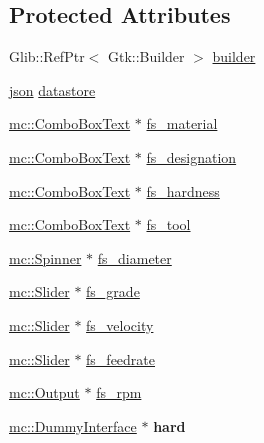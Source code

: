\subsection*{Protected Attributes}
\begin{DoxyCompactItemize}
\item 
Glib\+::\+Ref\+Ptr$<$ Gtk\+::\+Builder $>$ \hyperlink{classmcalc_1_1Application_ae877f6c9210ec88c743a54f750a54892}{builder}
\item 
\hyperlink{application_8hpp_ab701e3ac61a85b337ec5c1abaad6742d}{json} \hyperlink{classmcalc_1_1Application_a2fa9d06d424a8def5ea70fa07e844b9c}{datastore}
\item 
\hyperlink{classmc_1_1ComboBoxText}{mc\+::\+Combo\+Box\+Text} $\ast$ \hyperlink{classmcalc_1_1Application_a8c78f8ea0615db28858001aa5ed6b7b6}{fs\+\_\+material}
\item 
\hyperlink{classmc_1_1ComboBoxText}{mc\+::\+Combo\+Box\+Text} $\ast$ \hyperlink{classmcalc_1_1Application_a5dd81c68d005acedeb18336bfe87cdcb}{fs\+\_\+designation}
\item 
\hyperlink{classmc_1_1ComboBoxText}{mc\+::\+Combo\+Box\+Text} $\ast$ \hyperlink{classmcalc_1_1Application_acf53945a5bd5386c2d492e225878c45c}{fs\+\_\+hardness}
\item 
\hyperlink{classmc_1_1ComboBoxText}{mc\+::\+Combo\+Box\+Text} $\ast$ \hyperlink{classmcalc_1_1Application_a9775057e24515e6e3cf8c1c9a3144512}{fs\+\_\+tool}
\item 
\hyperlink{classmc_1_1Spinner}{mc\+::\+Spinner} $\ast$ \hyperlink{classmcalc_1_1Application_aa5fa7c6a44d89abb85a6947767261698}{fs\+\_\+diameter}
\item 
\hyperlink{classmc_1_1Slider}{mc\+::\+Slider} $\ast$ \hyperlink{classmcalc_1_1Application_aa92847f0410356a5515c461b269a840d}{fs\+\_\+grade}
\item 
\hyperlink{classmc_1_1Slider}{mc\+::\+Slider} $\ast$ \hyperlink{classmcalc_1_1Application_a6d4441380476fcbdafe23b28da5f6647}{fs\+\_\+velocity}
\item 
\hyperlink{classmc_1_1Slider}{mc\+::\+Slider} $\ast$ \hyperlink{classmcalc_1_1Application_a7cd486d0bde1d1ecdf82c41a5f2e6d53}{fs\+\_\+feedrate}
\item 
\hyperlink{classmc_1_1Output}{mc\+::\+Output} $\ast$ \hyperlink{classmcalc_1_1Application_a4b08a214c34fcb417f5cd14ca2e479c0}{fs\+\_\+rpm}
\item 
\hyperlink{classmc_1_1DummyInterface}{mc\+::\+Dummy\+Interface} $\ast$ {\bfseries hard}\hypertarget{classmcalc_1_1Application_aea962d0236a178c9c2f6ec8bdfa9c966}{}\label{classmcalc_1_1Application_aea962d0236a178c9c2f6ec8bdfa9c966}


\end{DoxyCompactItemize}
